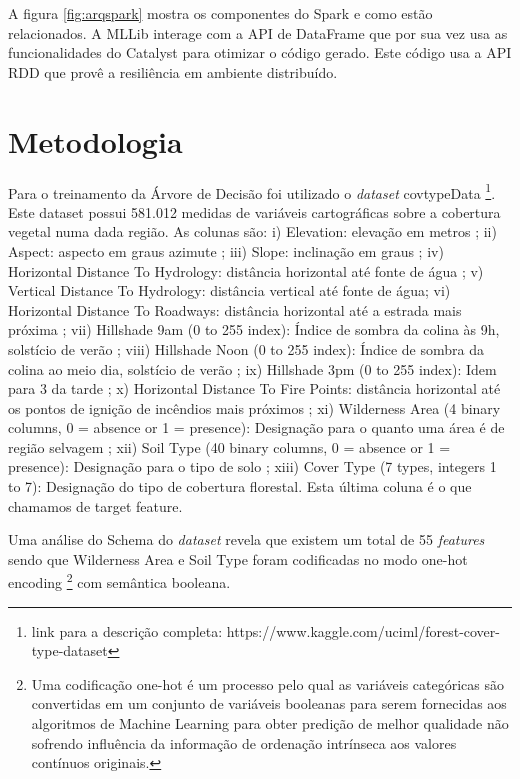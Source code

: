 \documentclass[12pt]{article}
\begin{document}
A figura \ref{fig:arqspark} mostra os componentes do Spark e como estão relacionados. A MLLib interage com a API de DataFrame que por sua vez usa as funcionalidades do Catalyst para otimizar o código gerado. Este código usa a API RDD que provê a resiliência em ambiente distribuído.

\section{Metodologia}
\label{sec:Metodologia}

Para o treinamento da Árvore de Decisão foi utilizado o \emph{dataset} covtypeData \footnote{link para a descrição completa: https://www.kaggle.com/uciml/forest-cover-type-dataset}. Este dataset possui 581.012 medidas de variáveis cartográficas sobre a cobertura vegetal numa dada região. As colunas são: i) Elevation: elevação em metros ; ii) Aspect: aspecto em graus azimute ; iii) Slope: inclinação em graus ; iv) Horizontal Distance To Hydrology: distância horizontal até fonte de água ; v) Vertical Distance To Hydrology: distância vertical até fonte de água; vi) Horizontal Distance To Roadways: distância horizontal até a estrada mais próxima ; vii) Hillshade 9am (0 to 255 index): Índice de sombra da colina às 9h, solstício de verão ; viii) Hillshade Noon (0 to 255 index): Índice de sombra da colina ao meio dia, solstício de verão ; ix) Hillshade 3pm (0 to 255 index): Idem para 3 da tarde ; x) Horizontal Distance To Fire Points: distância horizontal até os pontos de ignição de incêndios mais próximos ; xi) Wilderness Area (4 binary columns, 0 = absence or 1 = presence): Designação para o quanto uma área é de região selvagem ; xii) Soil Type (40 binary columns, 0 = absence or 1 = presence): Designação para o tipo de solo ; xiii) Cover Type (7 types, integers 1 to 7): Designação do tipo de cobertura florestal. Esta última coluna é o que chamamos de target feature. 

Uma análise do Schema do \emph{dataset} revela que existem um total de 55 \emph{features} sendo que Wilderness Area e Soil Type foram codificadas no modo one-hot encoding \footnote{Uma codificação one-hot é um processo pelo qual as variáveis categóricas são convertidas em um conjunto de variáveis booleanas para serem fornecidas aos algoritmos de Machine Learning para obter predição de melhor qualidade não sofrendo influência da informação de ordenação intrínseca aos valores contínuos originais.} com semântica booleana. 
\end{document}
